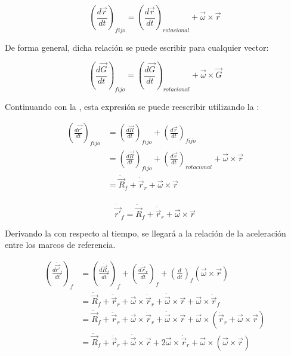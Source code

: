 \documentclass[/home/hernan-barquero/Documents/Apuntes_mecanica_teorica/main.tex]{subfiles}
\begin{document}
	\begin{equation}
		\left( \frac{d \vec{r}}{dt} \right)_{fijo} = \left( \frac{d \vec{r}}{dt} \right)_{rotacional} + \vec{\omega} \times \vec{r}
		\label{eq: inertialnoinertialr}
	\end{equation}

	De forma general, dicha relación se puede escribir para cualquier vector:

	\begin{equation}
		\left( \frac{d \vec{G}}{dt} \right)_{fijo} = \left( \frac{d \vec{G}}{dt} \right)_{rotacional} + \vec{\omega} \times \vec{G}
		\label{eq: inertialnoinertialG}
	\end{equation}

	Continuando con la , esta expresión se puede reescribir utilizando la :

	\begin{align*}
		\left( \frac{d \vec{{r}'}}{dt} \right)_{fijo} & = \left( \frac{d \vec{R}}{dt} \right)_{fijo} + \left( \frac{d \vec{r}}{dt} \right)_{fijo} \\ 
		& = \left( \frac{d \vec{R}}{dt} \right)_{fijo} + \left( \frac{d \vec{r}}{dt} \right)_{rotacional} + \vec{\omega} \times \vec{r} \\ 
		& = \dot{\vec{R}}_{f} + \dot{ \vec{r}}_{r} + \vec{\omega} \times \vec{r} \\ 
	\end{align*}

	\begin{definition}
		\begin{equation}
			\dot{ \vec{{r}'}}_{f} = \dot{\vec{R}}_{f} + \dot{ \vec{r}}_{r} + \vec{\omega} \times \vec{r}
			\label{eq: vinirelation}
		\end{equation}
	\end{definition}


	Derivando la  con respecto al tiempo, se llegará a la relación de la aceleración entre los marcos de referencia.

	\begin{align*}
		\left(\frac{d \dot{ \vec{{r}'}}_{f} }{dt}\right)_{f} &= \left(\frac{d  \dot{\vec{R}}_{f} }{dt}\right)_{f} + \left(\frac{d  \dot{ \vec{r}}_{r}}{dt}\right)_{f} + \left(\frac{d  }{dt}\right)_{f} \left( \vec{\omega} \times \vec{r} \right) \\ 
		& = \ddot{\vec{R}}_{f} + \ddot{ \vec{r}}_{r} + \vec{\omega} \times \dot{ \vec{r}}_{r} + \dot{\vec{\omega}} \times \vec{r} + \vec{\omega} \times \dot{\vec{r}}_{f} \\
		& = \ddot{\vec{R}}_{f} + \ddot{ \vec{r}}_{r} + \vec{\omega} \times \dot{ \vec{r}}_{r} + \dot{\vec{\omega}} \times \vec{r} + \vec{\omega} \times \left(\dot{\vec{r}}_{r} + \vec{\omega} \times \vec{r} \right) \\ 
		& = \ddot{\vec{R}}_{f} + \ddot{ \vec{r}}_{r} + \dot{\vec{\omega}} \times \vec{r}  + 2\vec{\omega} \times \dot{ \vec{r}}_{r} + \vec{\omega} \times \left( \vec{\omega} \times \vec{r}  \right)
	\end{align*}
\end{document}

